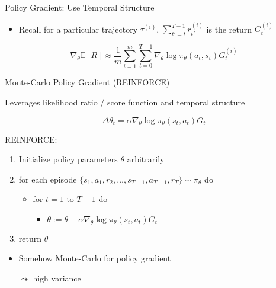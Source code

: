 \documentclass[aspectratio=169]{../latex_main/tntbeamer}  %
\begin{document}
\begin{frame}[c]{Policy Gradient: Use Temporal Structure}
	
\begin{itemize}
	\item Recall for a particular trajectory $\tau^{(i)}$, $\sum_{t'=t}^{T-1} r_{t'}^{(i)}$ is the return $G_t^{(i)}$
\end{itemize}

$$\nabla_\theta \mathbb{E}[R] \approx \frac{1}{m} \sum_{i=1}^m \sum_{t=0}^{T-1} \nabla_\theta \log \pi_\theta (a_t,s_t) G_t^{(i)} $$
	
	
\end{frame}
\begin{frame}[c]{Monte-Carlo Policy Gradient (REINFORCE)}
	
Leverages likelihood ratio / score function and temporal structure

$$ \Delta \theta_t = \alpha \nabla_\theta \log \pi_\theta (s_t, a_t) G_t $$
	
	
REINFORCE:
\begin{enumerate}
	\item Initialize policy parameters $\theta$ arbitrarily
	\item for each episode $\{s_1, a_1, r_2, \ldots, s_{T-1}, a_{T-1}, r_T \} \sim \pi_\theta $ do
	\begin{itemize}
		\item for $t=1$ to $T - 1$ do
		\begin{itemize}
			\item $\theta := \theta + \alpha \nabla_\theta \log \pi_\theta (s_t, a_t) G_t $
		\end{itemize}
	\end{itemize}
	\item return $\theta$
\end{enumerate}

\begin{itemize}
    \item Somehow Monte-Carlo for policy gradient
    \item[$\leadsto$] high variance
\end{itemize}
	
\end{frame}
\end{document}
